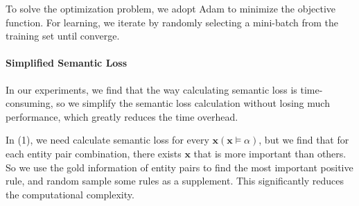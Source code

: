 To solve the optimization problem, we adopt Adam \cite{kingma2014adam} to minimize the objective function. For learning, we iterate by randomly selecting a mini-batch from the training set until converge.
\paragraph{Simplified Semantic Loss}

In our experiments, we find that the way \cite{xu2017semantic} calculating semantic loss is time-consuming, so we simplify the semantic loss calculation without losing much performance, which greatly reduces the time overhead.

In (1), we need calculate semantic loss for every $ \bm x (\bm x \models \alpha)$, but we find that for each entity pair combination, there exists $ \bm x $ that is more important than others. So we use the gold information of entity pairs to find the most important positive rule, and random sample some rules as a supplement. This significantly reduces the computational complexity.

